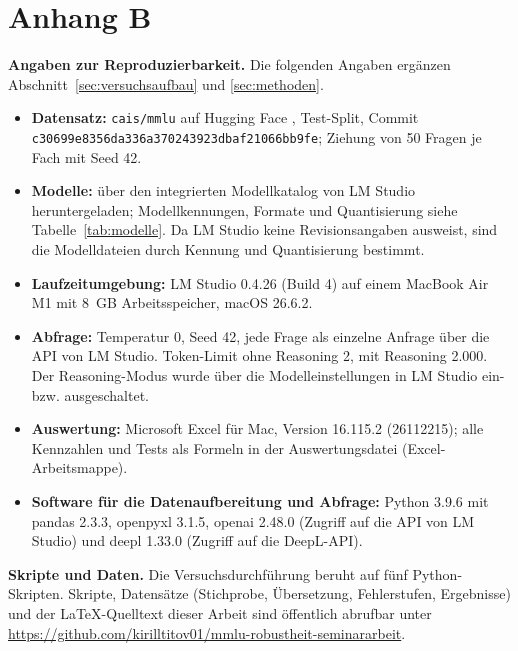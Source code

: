 \documentclass[a4paper,titlepage]{article}
\numberwithin{equation}{section} %
\begin{document}
\clearpage


\section*{Anhang B}

\textbf{Angaben zur Reproduzierbarkeit.} Die folgenden Angaben ergänzen Abschnitt~\ref{sec:versuchsaufbau} und \ref{sec:methoden}.

\begin{itemize}
\item \textbf{Datensatz:} \texttt{cais/mmlu} auf Hugging Face \citep{hendrycks_measuring_2021}, Test-Split, Commit \texttt{\small c30699e8356da336a370243923dbaf21066bb9fe}; Ziehung von 50 Fragen je Fach mit Seed 42.
\item \textbf{Modelle:} über den integrierten Modellkatalog von LM Studio heruntergeladen; Modellkennungen, Formate und Quantisierung siehe Tabelle~\ref{tab:modelle}. Da LM Studio keine Revisionsangaben ausweist, sind die Modelldateien durch Kennung und Quantisierung bestimmt.
\item \textbf{Laufzeitumgebung:} LM Studio 0.4.26 (Build 4) auf einem MacBook Air M1 mit 8~GB Arbeitsspeicher, macOS 26.6.2.
\item \textbf{Abfrage:} Temperatur 0, Seed 42, jede Frage als einzelne Anfrage über die API von LM Studio. Token-Limit ohne Reasoning 2, mit Reasoning 2.000. Der Reasoning-Modus wurde über die Modelleinstellungen in LM Studio ein- bzw. ausgeschaltet.
\item \textbf{Auswertung:} Microsoft Excel für Mac, Version 16.115.2 (26112215); alle Kennzahlen und Tests als Formeln in der Auswertungsdatei (Excel-Arbeitsmappe).
\item \textbf{Software für die Datenaufbereitung und Abfrage:} Python 3.9.6 mit pandas 2.3.3, openpyxl 3.1.5, openai 2.48.0 (Zugriff auf die API von LM Studio) und deepl 1.33.0 (Zugriff auf die DeepL-API).
\end{itemize}

\textbf{Skripte und Daten.} Die Versuchsdurchführung beruht auf fünf Python-Skripten. Skripte, Datensätze (Stichprobe, Übersetzung, Fehlerstufen, Ergebnisse) und der \LaTeX-Quelltext dieser Arbeit sind öffentlich abrufbar unter \url{https://github.com/kirilltitov01/mmlu-robustheit-seminararbeit}.
\end{document}
